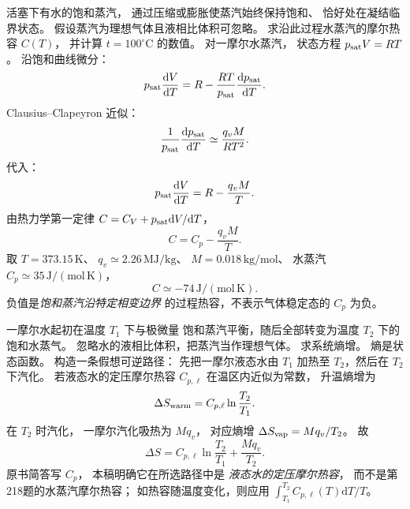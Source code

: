 活塞下有水的饱和蒸汽，
通过压缩或膨胀使蒸汽始终保持饱和、
恰好处在凝结临界状态。
假设蒸汽为理想气体且液相比体积可忽略。
求沿此过程水蒸汽的摩尔热容 $C(T)$，
并计算 $t=100^\circ\mathrm C$ 的数值。
\exsolution
对一摩尔水蒸汽，
状态方程
$p_{\rm sat}V=RT$。
沿饱和曲线微分：
\[
p_{\rm sat}\frac{\mathrm dV}{\mathrm dT}
=R-\frac{RT}{p_{\rm sat}}
\frac{\mathrm dp_{\rm sat}}{\mathrm dT}.
\]
Clausius--Clapeyron 近似：
\[
\frac1{p_{\rm sat}}
\frac{\mathrm dp_{\rm sat}}{\mathrm dT}
\simeq\frac{q_vM}{RT^2}.
\]
代入：
\[
p_{\rm sat}\frac{\mathrm dV}{\mathrm dT}
=R-\frac{q_vM}{T}.
\]
由热力学第一定律
$C=C_V+p_{\rm sat}\mathrm dV/\mathrm dT$，
\[
\boxed{C=C_p-\frac{q_vM}{T}}.
\]
取 $T=373.15\,\mathrm K$、
$q_v\simeq2.26\,\mathrm{MJ/kg}$、
$M=0.018\,\mathrm{kg/mol}$、
水蒸汽 $C_p\simeq35\,\mathrm{J/(mol\,K)}$，
\[
\boxed{C\simeq-74\,\mathrm{J/(mol\,K)}}.
\]
\excheck 负值是\emph{饱和蒸汽沿特定相变边界}
的过程热容，不表示气体稳定态的 $C_p$ 为负。

一摩尔水起初在温度 $T_1$ 下与极微量
饱和蒸汽平衡，随后全部转变为温度
$T_2$ 下的饱和水蒸气。
忽略水的液相比体积，把蒸汽当作理想气体。
求系统熵增。
\exsolution
熵是状态函数。
构造一条假想可逆路径：
先把一摩尔液态水由 $T_1$
加热至 $T_2$，然后在 $T_2$ 下汽化。
若液态水的定压摩尔热容
$C_{p,\ell}$ 在温区内近似为常数，
升温熵增为
\[
\Delta S_{\rm warm}
=C_{p,\ell}\ln\frac{T_2}{T_1}.
\]
在 $T_2$ 时汽化，
一摩尔汽化吸热为 $Mq_v$，
对应熵增
$\Delta S_{\rm vap}=Mq_v/T_2$。
故
\[
\boxed{\Delta S=
C_{p,\ell}\ln\frac{T_2}{T_1}
+\frac{Mq_v}{T_2}}.
\]
\excheck 原书简答写 $C_p$，
本稿明确它在所选路径中是
\emph{液态水的定压摩尔热容}，
而不是第218题的水蒸汽摩尔热容；
如热容随温度变化，则应用
$\int_{T_1}^{T_2}C_{p,\ell}(T)\mathrm dT/T$。
